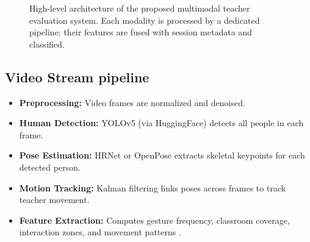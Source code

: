 \begin{figure}[H]
    \centering
    \caption{High-level architecture of the proposed multimodal teacher evaluation system. Each modality is processed by a dedicated pipeline; their features are fused with session metadata and classified.}
    \label{fig:multimodal_architecture}
\end{figure}

\subsection{Video Stream pipeline}  
\begin{itemize}
    \item \textbf{Preprocessing:} Video frames are normalized and denoised.
    \item \textbf{Human Detection:} YOLOv5 (via HuggingFace) detects all people in each frame.
    \item \textbf{Pose Estimation:} HRNet or OpenPose extracts skeletal keypoints for each detected person.
    \item \textbf{Motion Tracking:} Kalman filtering links poses across frames to track teacher movement.
    \item \textbf{Feature Extraction:} Computes gesture frequency, classroom coverage, interaction zones, and movement patterns \cite{mcneill1992hand}.
\end{itemize}

